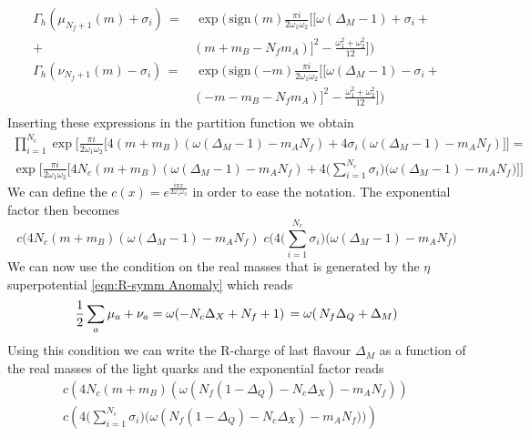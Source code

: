 \begin{equation}
\begin{aligned}
\Gamma_h (  \mu_{N_f+1}(m) + \sigma_i ) \, = &\, \exp \bigg( \, \mbox{sign}(m) \frac{\pi i}{2 \omega_1 \omega_2 } \big[ [ \omega (\Delta_M - 1) + \sigma_i + \\
+ & ( m + m_B - N_f m_A)]^2 - \frac{ \omega_1^2 + \omega_2^2 }{12} \big] \bigg )\\
\Gamma_h (  \nu_{N_f+1}(m) - \sigma_i  ) \, = &\, \exp \bigg( \, \mbox{sign}(-m) \frac{\pi i}{2 \omega_1 \omega_2 } \big[ [ \omega (\Delta_M - 1) - \sigma_i + \\
&( - m - m_B - N_f m_A)]^2 - \frac{ \omega_1^2 + \omega_2^2 }{12} \big] \bigg )\\
\end{aligned}
\end{equation}
Inserting these expressions in the partition function we obtain 
\begin{multline}
 \prod_{i=1}^{N_c} \exp \bigg[ \frac{\pi i}{2 \omega_1 \omega_2 } \bigg[ 4  ( m  + m_B ) ( \omega (\Delta_M - 1) -  m_A N_f ) +  4 \sigma_i  (\omega (\Delta_M - 1) -  m_A N_f)\bigg] \bigg] = \\
 \exp \bigg[ \frac{\pi i}{2 \omega_1 \omega_2 } \bigg[ 4 N_c  ( m  + m_B ) ( \omega (\Delta_M - 1) -  m_A N_f ) 
 +4\big( \sum_{i=1}^{N_c}  \sigma_i  \big) \big(\omega (\Delta_M - 1) -  m_A N_f \big)  \bigg] \bigg]
\end{multline}
We can define the $ c(x) = e^{ \frac{i \pi x }{2 \omega_1 \omega_2}}$ in order to ease the notation.
The exponential factor then becomes
\begin{equation}
c( 4 N_c  ( m  + m_B ) ( \omega (\Delta_M - 1) -  m_A N_f ) \;  c ( 4\big( \sum_{i=1}^{N_c}  \sigma_i  \big) \big (\omega (\Delta_M - 1) -  m_A N_f \big)
\end{equation}
We can now use the condition on the real masses that is generated by the $\eta$ superpotential \eqref{eqn:R-symm Anomaly} which reads
\begin{equation}
	{ 1 \over 2 } \sum_a \mu_a + \nu_a  = \omega ( -N_c \Delta_X + N_f + 1 )  \, =\omega( \, N_f \Delta_Q +  \Delta_M )
\end{equation}
Using this condition we can write the R-charge of last flavour $\Delta_M$ as a function of the real masses of the light quarks and the exponential factor reads
\begin{multline}
c \left( 4 N_c  ( m  + m_B ) ( \omega ( N_f (1 - \Delta_Q)  - N_c \Delta_X ) -  m_A N_f )\right)\,  \\
c\left( 4\big( \sum_{i=1}^{N_c}   \sigma_i  \big) \big ( \omega( N_f (1 - \Delta_Q)  - N_c \Delta_X)  -  m_A N_f ) \big) \right)
\end{multline}

